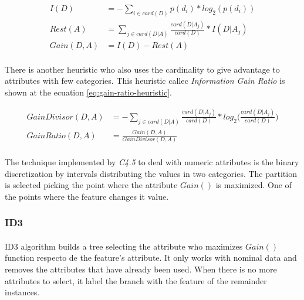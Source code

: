 \documentclass{article}
\begin{document}
				\begin{align}
				\label{eq:information-heuristic}
					I(D) &= - \sum_{i \in card(D)}  p(d_i) * log_2(p(d_i)) \\
				\label{eq:rest-heuristic}
					Rest(A) &= \sum_{j \in card(D|A)} \frac{card(D|A_j)}{card(D)} * I(D|A_j) \\
				\label{eq:gain-heuristic}
					Gain(D, A) &= I(D) - Rest(A)
				\end{align}

				\paragraph{}
				There is another heuristic who also uses the cardinality to give advantage to attributes with few categories. This heuristic callec \emph{Information Gain Ratio} is shown at the ecuation \eqref{eq:gain-ratio-heuristic}.

				\begin{align}
				\label{eq:gain-divisor-heuristic}
					GainDivisor(D,A) &= - \sum_{j \in card(D|A)}\frac{card(D|A_j)}{card(D)} * log_2\bigg(\frac{card(D|A_j)}{card(D)}\bigg)\\
				\label{eq:gain-ratio-heuristic}
					GainRatio(D,A) &= \frac{Gain(D,A)}{GainDivisor(D,A)}
				\end{align}

				\paragraph{}
				The technique implemented by \emph{C4.5} to deal with numeric attributes is the binary discretization by intervals distributing the values in two categories. The partition is selected picking the point where the attribute $Gain()$ is maximized. One of the points where the feature changes it value.

			\subsubsection{ID3}
			\label{sec:id3-tree}

				\paragraph{}
				ID3 algorithm builds a tree selecting the attribute who maximizes $Gain()$ function respecto de the feature's attribute. It only works with nominal data and removes the attributes that have already been used. When there is no more attributes to select, it label the branch with the feature of the remainder instances.
\end{document}
